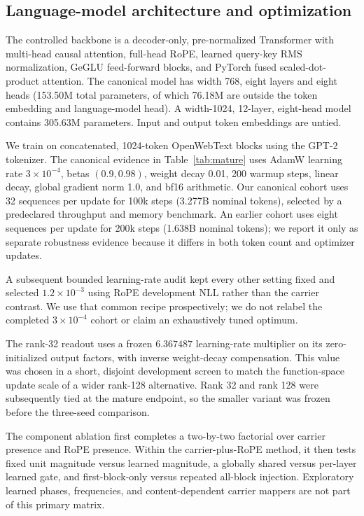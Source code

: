 \documentclass{article}
\begin{document}
\subsection{Language-model architecture and optimization}

The controlled backbone is a decoder-only, pre-normalized Transformer with
multi-head causal attention, full-head RoPE, learned query-key RMS
normalization, GeGLU feed-forward blocks, and PyTorch fused scaled-dot-product
attention. The canonical model has width 768, eight layers and eight heads
(153.50M total parameters, of which 76.18M are outside the token embedding and
language-model head). A width-1024, 12-layer, eight-head model contains
305.63M parameters. Input and output token embeddings are untied.

We train on concatenated, 1024-token OpenWebText blocks using the GPT-2
tokenizer. The canonical evidence in Table~\ref{tab:mature} uses AdamW
learning rate $3\times10^{-4}$, betas $(0.9,0.98)$,
weight decay 0.01, 200 warmup steps, linear decay, global gradient norm 1.0,
and bf16 arithmetic. Our canonical cohort uses 32 sequences per update for
100k steps (3.277B nominal tokens), selected by a predeclared throughput and
memory benchmark. An earlier cohort uses eight sequences per update for 200k
steps (1.638B nominal tokens); we report it only as separate robustness
evidence because it differs in both token count and optimizer updates.

A subsequent bounded learning-rate audit kept every other setting fixed and
selected $1.2\times10^{-3}$ using RoPE development NLL rather than the carrier
contrast. We use that common recipe prospectively; we do not relabel the
completed $3\times10^{-4}$ cohort or claim an exhaustively tuned optimum.

The rank-32 readout uses a frozen $6.367487$ learning-rate multiplier on its
zero-initialized output factors, with inverse weight-decay compensation. This
value was chosen in a short, disjoint development screen to match the
function-space update scale of a wider rank-128 alternative. Rank 32 and rank
128 were subsequently tied at the mature endpoint, so the smaller variant was
frozen before the three-seed comparison.

The component ablation first completes a two-by-two factorial over carrier
presence and RoPE presence. Within the carrier-plus-RoPE method, it then tests
fixed unit magnitude versus learned magnitude, a globally shared versus
per-layer learned gate, and first-block-only versus repeated all-block
injection. Exploratory
learned phases, frequencies, and content-dependent carrier mappers are not
part of this primary matrix.
\end{document}
